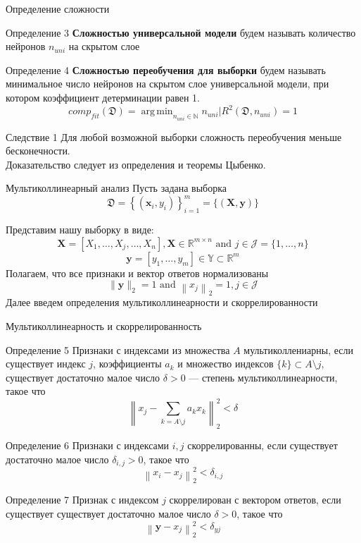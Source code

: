 \documentclass[10pt,pdf,hyperref={unicode}]{beamer}
\DeclareMathOperator*{\argmin}{arg\,min}
\begin{document}
\begin{frame}{Определение сложности}
\begin{block}{Определение 3}
	\justifying
	\textbf{Сложностью универсальной модели} будем называть количество нейронов $n_{uni}$ на скрытом слое 
\end{block}
\begin{block}{Определение 4}
	\justifying
	\textbf{Сложностью переобучения для выборки} будем называть минимальное число нейронов на скрытом слое универсальной модели, при котором коэффициент детерминации равен 1.
	$$ comp_{fit}(\mathfrak{D}) = \argmin_{n_{uni}\in \mathbb{N}} n_{uni}| R^2(\mathfrak{D},n_{uni}) = 1$$
\end{block}
\begin{block}{Следствие 1}
	\justifying 
	Для любой возможной выборки сложность переобучения меньше бесконечности.\\
	Доказательство следует из определения и теоремы Цыбенко.
\end{block}
\end{frame}
\begin{frame}{Мультиколлинеарный анализ}
\justifying
Пусть задана выборка
$$\mathfrak{D}=\left\{\left(\mathbf{x}_{i}, y_{i}\right)\right\}_{i=1}^{m} = \{(\mathbf{X}, \mathbf{y})\}$$

Представим нашу выборку в виде:
$$ \mathbf{X}=\left[X_{1}, \ldots, X_{j}, \ldots, X_{n}\right], \mathbf{X} \in \mathbb{R}^{m \times n} \text { and } j \in \mathcal{J}=\{1, \ldots, n\}$$
$$\mathbf{y} = [y_1,\ldots,y_m] \in \mathbb{Y}\subset \mathbb{R}^m$$
Полагаем, что все признаки и вектор ответов нормализованы
$$\|\mathbf{y}\|_{2}=1 \text { and }\left\|x_{j}\right\|_{2}=1, j \in \mathcal{J}$$
Далее введем определения мультиколлинеарности и скоррелированности 
\end{frame}
\begin{frame}{Мультиколлинеарность и скоррелированность}
\begin{block}{Определение 5}
	\justifying
	\small
	Признаки с индексами из множества $A$ мультиколлениарны, если существует индекс $j$, коэффициенты $a_k$ и множество индексов $\{k\}\subset A\setminus j$,  существует достаточно малое число $\delta>0$	---  степень мультиколлинеарности, такое что
	$$\left\|x_{j}-\sum_{k=A\setminus j} a_{k} x_{k}\right\|_{2}^{2}<\delta$$

\end{block}
\begin{block}{Определение 6}
	\justifying
	\small
	Признаки с индексами $i,j$ скоррелированны, если существует достаточно малое число $\delta_{i,j}>0$, такое что
	$$\left\|x_{i}-x_{j}\right\|_{2}^{2}<\delta_{i,j}$$
\end{block}
\begin{block}{Определение 7}
	\justifying
	\small
	Признак с индексом $j$ скоррелирован с вектором ответов, если существует   существует достаточно малое число $\delta>0$, такое что
	$$\left\|\mathbf{y}-x_{j}\right\|_{2}^{2}<\delta_{y j}$$
\end{block}
\end{frame}
\end{document}
